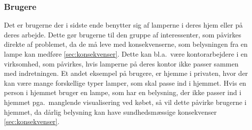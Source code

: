 \subsubsection{Brugere}
Det er brugerne der i sidste ende benytter sig af lamperne i deres hjem eller på deres arbejde. Dette gør brugerne til den gruppe af interessenter, som påvirkes direkte af problemet, da de må leve med konsekvenserne, som belysningen fra en lampe kan medføre \ref{sec:konsekvenser}. Dette kan bl.a.\ være kontorarbejdere i en virksomhed, som påvirkes, hvis lamperne på deres kontor ikke passer sammen med indretningen. Et andet eksempel på brugere, er hjemme i privaten, hvor der kan være mange forskellige typer lamper, som skal passe ind i hjemmet. Hvis en person i hjemmet bruger en lampe, som har en belysning, der ikke passer ind i hjemmet pga.\ manglende visualisering ved købet, så vil dette påvirke brugerne i hjemmet, da dårlig belysning kan have sundhedsmæssige konsekvenser \ref{sec:konsekvenser}.

